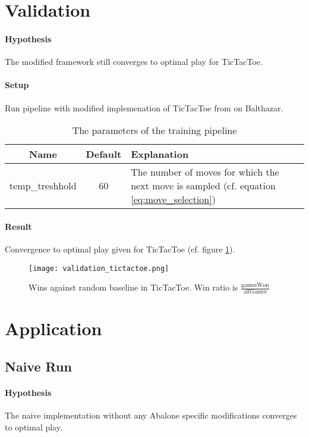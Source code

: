 \section{Validation}
\paragraph{Hypothesis} The modified framework still converges to optimal play for TicTacToe.
\paragraph{Setup} Run pipeline with modified implemenation of TicTacToe from \cite{thakoor_suragnairalpha-zero-general_nodate} on Balthazar.
\begin{table}
    \begin{center}
        \begin{tabularx}{\textwidth}{ c|c|X }
            Name            & Default & Explanation                                                                                   \\
            \hline
            \hline
            temp\_treshhold & 60      & The number of moves for which the next move is sampled (cf. equation \ref{eq:move_selection}) \\
        \end{tabularx}
    \end{center}
    \caption{The parameters of the training pipeline}
\end{table}
\paragraph{Result} Convergence to optimal play given for TicTacToe (cf. figure \ref{tictactoe_performance}).

\begin{figure}
    \centering
    \texttt{[image: validation\_tictactoe.png]}
    \caption{Wins against random baseline in TicTacToe. Win ratio is $\frac{\text{gamesWon}}{\text{allGames}}$ }
    \label{tictactoe_performance}
\end{figure}
\section{Application}
\subsection{Naive Run}
\paragraph{Hypothesis} The naive implementation without any Abalone specific modifications converges to optimal play.
